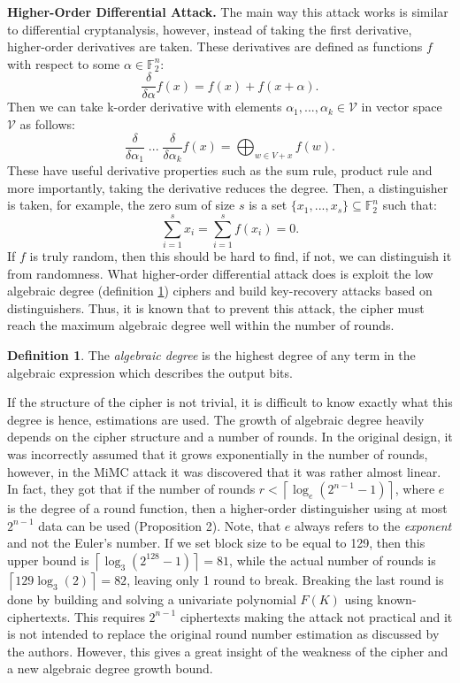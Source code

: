 \documentclass{Resources/UoBLab1}
\theoremstyle{definition}
\newtheorem{definition}[theorem]{Definition}
\begin{document}
\noindent\textbf{Higher-Order Differential Attack.} The main way this attack works is similar to differential cryptanalysis, however, instead of taking the first derivative, higher-order derivatives are taken. These derivatives are defined as functions $f$ with respect to some $\alpha \in \mathbb{F}^n_2$:
\[
    \frac{\delta}{\delta \alpha}f(x) = f(x) + f(x + \alpha).
\]
Then we can take k-order derivative with elements $\alpha_1, ..., \alpha_k \in \mathcal{V}$ in vector space $\mathcal{V}$ as follows:
\[
    \frac{\delta}{\delta \alpha_1}\;...\;\frac{\delta}{\delta \alpha_k} f(x) = \bigoplus_{w \in V + x}f(w).
\]
These have useful derivative properties such as the sum rule, product rule and more importantly, taking the derivative reduces the degree. Then, a distinguisher is taken, for example, the zero sum of size $s$ is a set $\{x_1, ..., x_s\} \subseteq \mathbb{F}^n_2$ such that:
\[
    \sum^s_{i=1}x_i = \sum^s_{i=1}f(x_i) = 0.
\]
If $f$ is truly random, then this should be hard to find, if not, we can distinguish it from randomness. What higher-order differential attack does is exploit the low algebraic degree (definition \ref{def:algebraic-degree}) ciphers and build key-recovery attacks based on distinguishers\cite{CryptanalysisCource}. Thus, it is known that to prevent this attack, the cipher must reach the maximum algebraic degree well within the number of rounds.
\begin{definition}\label{def:algebraic-degree}
    The \textit{algebraic degree} is the highest degree of any term in the algebraic expression which describes the output bits.
\end{definition}
If the structure of the cipher is not trivial, it is difficult to know exactly what this degree is hence, estimations are used. The growth of algebraic degree heavily depends on the cipher structure and a number of rounds. In the original design, it was incorrectly assumed that it grows exponentially in the number of rounds, however, in the MiMC attack\cite{MiMCAttack} it was discovered that it was rather almost linear. In fact, they got that if the number of rounds \(r < \left\lceil \log_e(2^{n-1}-1) \right\rceil\), where $e$ is the degree of a round function, then a higher-order distinguisher using at most $2^{n-1}$ data can be used (Proposition 2\cite{MiMCAttack}). Note, that $e$ always refers to the \textit{exponent} and not the Euler's number. If we set block size to be equal to 129, then this upper bound is \(\left\lceil \log_3(2^{128}-1) \right\rceil = 81\), while the actual number of rounds is \(\left\lceil 129\log_3(2) \right\rceil = 82\), leaving only 1 round to break. Breaking the last round is done by building and solving a univariate polynomial $F(K)$ using known-ciphertexts. This requires $2^{n-1}$ ciphertexts making the attack not practical and it is not intended to replace the original round number estimation as discussed by the authors. However, this gives a great insight of the weakness of the cipher and a new algebraic degree growth bound.
\end{document}
